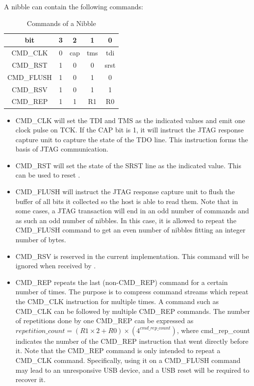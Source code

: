 \documentclass[main\_\_EN.tex]{subfiles}
\begin{document}
A nibble can contain the following commands:

\begin{table}[H]
\centering
\caption{Commands of a Nibble}
\label{tab:usbserialjtag-commands-of-a-nibble}

\begin{tabular}{|c|c c c c|}\hline
\rowcolor{lightgray}
\textbf{bit} & \textbf{3} & \textbf{2} & \textbf{1} & \textbf{0}\\\hline

CMD\_CLK & 0 &  cap & tms & tdi \\\hline
CMD\_RST & 1 & 0 & 0 & srst \\\hline
CMD\_FLUSH & 1 & 0 & 1 & 0 \\\hline
CMD\_RSV & 1 & 0 & 1 & 1 \\\hline
CMD\_REP & 1 & 1 & R1 & R0 \\\hline
\end{tabular}
\end{table}

\begin{itemize}
\item CMD\_CLK will set the TDI and TMS as the indicated values and emit one clock pulse on TCK. If the CAP bit is 1, it will instruct the JTAG response capture unit to capture the state of the TDO line. This instruction forms the basis of JTAG communication.
\item CMD\_RST will set the state of the SRST line as the indicated value. This can be used to reset \chipname{}.
\item CMD\_FLUSH will instruct the JTAG response capture unit to flush the buffer of all bits it collected so the host is able to read them. Note that in some cases, a JTAG transaction will end in an odd number of commands and as such an odd number of nibbles. In this case, it is allowed to repeat the CMD\_FLUSH command to get an even number of nibbles fitting an integer number of bytes.
\item CMD\_RSV is reserved in the current implementation. This command will be ignored when received by \chipname{}.
\item CMD\_REP repeats the last (non-CMD\_REP) command for a certain number of times. The purpose is to compress command streams which repeat the CMD\_CLK instruction for multiple times. A command such as CMD\_CLK can be followed by multiple CMD\_REP commands. The number of repetitions done by one CMD\_REP can be expressed as \begin{math}repetition\_count = (R1 \times 2 + R0) \times (4^{cmd\_rep\_count})\end{math}, where cmd\_rep\_count indicates the number of the CMD\_REP instruction that went directly before it. Note that the CMD\_REP command is only intended to repeat a CMD\_CLK command. Specifically, using it on a CMD\_FLUSH command may lead to an unresponsive USB device, and a USB reset will be required to recover it.
\end{itemize}
\end{document}

